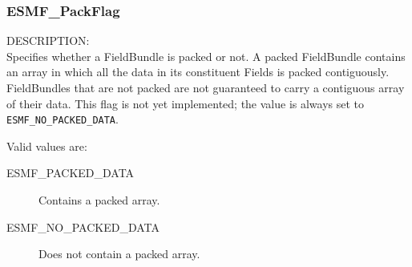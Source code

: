
\subsubsection{ESMF\_PackFlag}

\label{opt:packflag}
{\sf DESCRIPTION:\\}
Specifies whether a FieldBundle is packed or not.  A packed 
FieldBundle contains an array in which all the data in its 
constituent Fields is packed contiguously.  FieldBundles that
are not packed are not guaranteed to carry a contiguous 
array of their data.  This flag is not yet implemented;
the value is always set to {\tt ESMF\_NO\_PACKED\_DATA}.

Valid values are:
\begin{description}
   \item [ESMF\_PACKED\_DATA] 
         Contains a packed array.
   \item [ESMF\_NO\_PACKED\_DATA]
         Does not contain a packed array.
\end{description}







